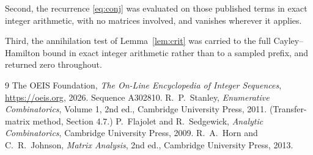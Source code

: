 \documentclass[11pt,a4paper]{article}
\theoremstyle{plain}
\theoremstyle{definition}
\begin{document}
Second, the recurrence \eqref{eq:conj} was evaluated on those published terms in exact
integer arithmetic, with no matrices involved, and vanishes wherever it applies.

Third, the annihilation test of Lemma~\ref{lem:crit} was carried to the full
Cayley--Hamilton bound in exact integer arithmetic rather than to a sampled prefix, and
returned zero throughout.

\begin{thebibliography}{9}
 The OEIS Foundation, \emph{The On-Line Encyclopedia of Integer
Sequences}, \url{https://oeis.org}, 2026. Sequence A302810.
 R.~P.~Stanley, \emph{Enumerative Combinatorics}, Volume 1, 2nd ed.,
Cambridge University Press, 2011. (Transfer-matrix method, Section 4.7.)
 P.~Flajolet and R.~Sedgewick, \emph{Analytic Combinatorics}, Cambridge
University Press, 2009.
 R.~A.~Horn and C.~R.~Johnson, \emph{Matrix Analysis}, 2nd ed., Cambridge
University Press, 2013.
\end{thebibliography}
\end{document}
